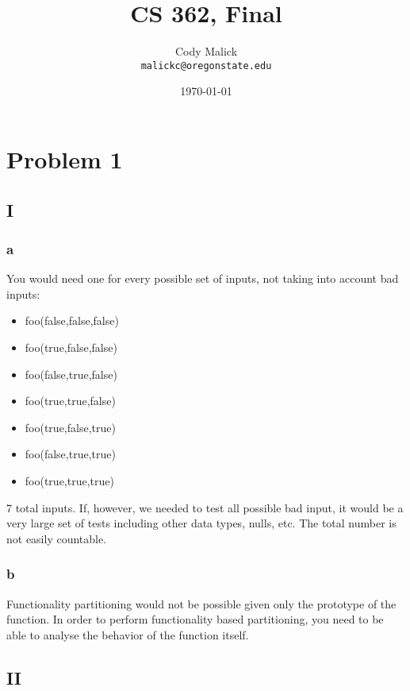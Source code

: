 \documentclass[10pt,letterpaper]{article}
\begin{document}
  \title{CS 362, Final}
  \author{Cody Malick\\
  \texttt{malickc@oregonstate.edu}}
  \date{\today}
  \maketitle

\section*{Problem 1}
	\subsection*{I}
	\subsubsection*{a}
		You would need one for every possible set of inputs, not taking
		into account bad inputs:
		\begin{itemize}
			\item foo(false,false,false)
			\item foo(true,false,false)
			\item foo(false,true,false)
			\item foo(true,true,false)
			\item foo(true,false,true)
			\item foo(false,true,true)
			\item foo(true,true,true)
		\end{itemize}

		7 total inputs. If, however, we needed to test all possible bad
		input, it would be a very large set of tests including other
		data types, nulls, etc. The total number is not easily
		countable.

	\subsubsection*{b}
		Functionality partitioning would not be possible given only the
		prototype of the function. In order to perform functionality
		based partitioning, you need to be able to analyse the behavior
		of the function itself.

	\subsection*{II}
\end{document}
